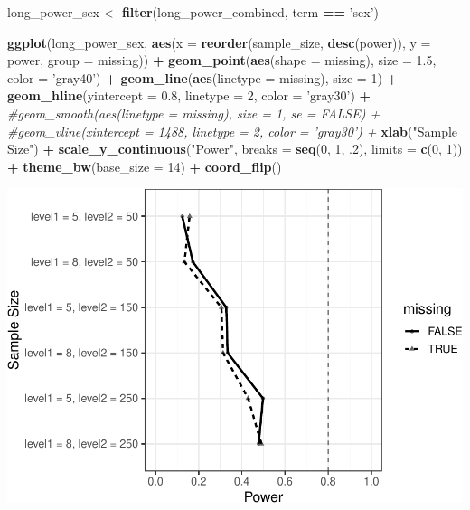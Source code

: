 \documentclass[man]{apa6}
\newenvironment{Shaded}{\begin{snugshade}}{\end{snugshade}}
\newcommand{\CommentTok}[1]{\textcolor[rgb]{0.56,0.35,0.01}{\textit{#1}}}
\newcommand{\DataTypeTok}[1]{\textcolor[rgb]{0.13,0.29,0.53}{#1}}
\newcommand{\DecValTok}[1]{\textcolor[rgb]{0.00,0.00,0.81}{#1}}
\newcommand{\FloatTok}[1]{\textcolor[rgb]{0.00,0.00,0.81}{#1}}
\newcommand{\KeywordTok}[1]{\textcolor[rgb]{0.13,0.29,0.53}{\textbf{#1}}}
\newcommand{\NormalTok}[1]{#1}
\newcommand{\OperatorTok}[1]{\textcolor[rgb]{0.81,0.36,0.00}{\textbf{#1}}}
\newcommand{\StringTok}[1]{\textcolor[rgb]{0.31,0.60,0.02}{#1}}
\begin{document}
\begin{Shaded}
\begin{Highlighting}[]
\NormalTok{long_power_sex <-}\StringTok{ }\KeywordTok{filter}\NormalTok{(long_power_combined, term }\OperatorTok{==}\StringTok{ 'sex'}\NormalTok{)}

\KeywordTok{ggplot}\NormalTok{(long_power_sex, }\KeywordTok{aes}\NormalTok{(}\DataTypeTok{x =} \KeywordTok{reorder}\NormalTok{(sample_size, }\KeywordTok{desc}\NormalTok{(power)), }\DataTypeTok{y =}\NormalTok{ power, }
                          \DataTypeTok{group =}\NormalTok{ missing)) }\OperatorTok{+}\StringTok{ }
\StringTok{  }\KeywordTok{geom_point}\NormalTok{(}\KeywordTok{aes}\NormalTok{(}\DataTypeTok{shape =}\NormalTok{ missing), }\DataTypeTok{size =} \FloatTok{1.5}\NormalTok{, }\DataTypeTok{color =} \StringTok{'gray40'}\NormalTok{) }\OperatorTok{+}\StringTok{ }
\StringTok{  }\KeywordTok{geom_line}\NormalTok{(}\KeywordTok{aes}\NormalTok{(}\DataTypeTok{linetype =}\NormalTok{ missing), }\DataTypeTok{size =} \DecValTok{1}\NormalTok{) }\OperatorTok{+}
\StringTok{  }\KeywordTok{geom_hline}\NormalTok{(}\DataTypeTok{yintercept =} \FloatTok{0.8}\NormalTok{, }\DataTypeTok{linetype =} \DecValTok{2}\NormalTok{, }\DataTypeTok{color =} \StringTok{'gray30'}\NormalTok{) }\OperatorTok{+}\StringTok{ }
\StringTok{  }\CommentTok{#geom_smooth(aes(linetype = missing), size = 1, se = FALSE) +}
\StringTok{  }\CommentTok{#geom_vline(xintercept = 1488, linetype = 2, color = 'gray30') +}
\StringTok{  }\KeywordTok{xlab}\NormalTok{(}\StringTok{"Sample Size"}\NormalTok{) }\OperatorTok{+}\StringTok{ }
\StringTok{  }\KeywordTok{scale_y_continuous}\NormalTok{(}\StringTok{"Power"}\NormalTok{, }\DataTypeTok{breaks =} \KeywordTok{seq}\NormalTok{(}\DecValTok{0}\NormalTok{, }\DecValTok{1}\NormalTok{, }\FloatTok{.2}\NormalTok{), }\DataTypeTok{limits =} \KeywordTok{c}\NormalTok{(}\DecValTok{0}\NormalTok{, }\DecValTok{1}\NormalTok{)) }\OperatorTok{+}
\StringTok{  }\KeywordTok{theme_bw}\NormalTok{(}\DataTypeTok{base_size =} \DecValTok{14}\NormalTok{) }\OperatorTok{+}\StringTok{ }
\StringTok{  }\KeywordTok{coord_flip}\NormalTok{()}
\end{Highlighting}
\end{Shaded}

\includegraphics{power_simulation_files/figure-latex/long-power-curve-h-1.pdf}
\end{document}
